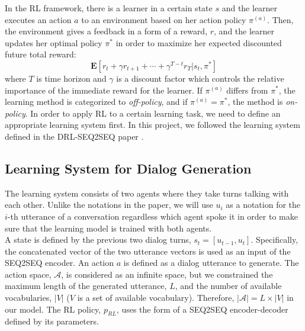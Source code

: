 In the RL framework, there is a learner in a certain state $s$ and the learner executes an action $a$ to an environment based on her action policy $\pi^{(a)}$. Then, the environment gives a feedback in a form of a reward, $r$, and the learner updates her optimal policy $\pi^*$ in order to maximize her expected discounted future total reward: 
\[
	\mathbf{E}[r_t + \gamma r_{t+1} + \cdots + \gamma^{T-t}r_T | s_t, \pi^* ]
\]
where $T$ is time horizon and $\gamma$ is a discount factor which controls the relative importance of the immediate reward for the learner. If $\pi^{(a)}$ differs from $\pi^*$, the learning method is categorized to \textit{off-policy}, and if $\pi^{(a)} = \pi^*$, the method is \textit{on-policy}. In order to apply RL to a certain learning task, we need to define an appropriate learning system first. In this project, we followed the learning system defined in the DRL-SEQ2SEQ paper \cite{Li}. 

\subsection{Learning System for Dialog Generation}
The learning system consists of two agents where they take turns talking with each other. Unlike the notations in the paper, we will use $u_i$ as a notation for the $i$-th utterance of a conversation regardless which agent spoke it in order to make sure that the learning model is trained with both agents. \\
A state is defined by the previous two dialog turns, $s_t = [u_{t-1}, u_t]$. Specifically, the concatenated vector of the two utterance vectors is used as an input of the SEQ2SEQ encoder. An action $a$ is defined as a dialog utterance to generate. The action space, $\mathcal{A}$, is considered as an infinite space, but we constrained the maximum length of the generated utterance, $L$, and the number of available vocabularies, $|V|$ ($V$ is a set of available vocabulary). Therefore, $|\mathcal{A}|=L\times |V|$ in our model. The RL policy, $p_{RL}$, uses the form of a SEQ2SEQ encoder-decoder defined by its parameters. 

